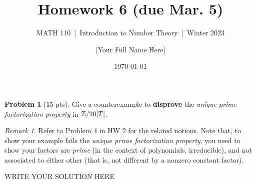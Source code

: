 \documentclass[11pt]{article}
\title{Homework 6 (due Mar. 5)}
\author{[Your Full Name Here]}
\subtitle{MATH 110~|~Introduction to Number Theory~|~Winter 2023}
\date{\today}
\theoremstyle{plain}
\theoremstyle{definition}
\newtheorem{problem}{Problem}
\theoremstyle{remark}
\newtheorem*{remark}{Remark}
\numberwithin{equation}{problem}
\begin{document}
\maketitle


\begin{problem}[15 pts]
	Give a counterexample to \textbf{disprove} the \emph{unique prime factorization property} in $\mathbb{Z}/20[T]$.
	\begin{remark}
		Refer to Problem 4 in HW 2 for the related notions. Note that, to show your example fails the \emph{unique prime factorization property}, you need to show your factors are \emph{prime} (in the context of polynomials, irreducible), and not associated to either other (that is, not different by a nonzero constant factor).
	\end{remark}
\end{problem}
\begin{solution} %
WRITE YOUR SOLUTION HERE
\end{solution}\clearpage %
\end{document}
